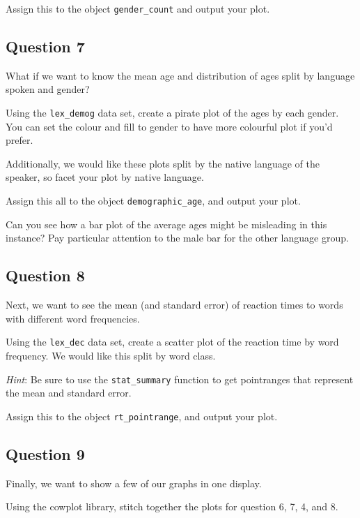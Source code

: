 \documentclass[
]{book}
\begin{document}
Assign this to the object \texttt{gender\_count} and output your plot.

\hypertarget{question-7-2}{%
\subsection{Question 7}\label{question-7-2}}

What if we want to know the mean age and distribution of ages split by language spoken and gender?

Using the \texttt{lex\_demog} data set, create a pirate plot of the ages by each gender. You can set the colour and fill to gender to have more colourful plot if you'd prefer.

Additionally, we would like these plots split by the native language of the speaker, so facet your plot by native language.

Assign this all to the object \texttt{demographic\_age}, and output your plot.

Can you see how a bar plot of the average ages might be misleading in this instance? Pay particular attention to the male bar for the other language group.

\hypertarget{question-8-2}{%
\subsection{Question 8}\label{question-8-2}}

Next, we want to see the mean (and standard error) of reaction times to words with different word frequencies.

Using the \texttt{lex\_dec} data set, create a scatter plot of the reaction time by word frequency. We would like this split by word class.

\emph{Hint}: Be sure to use the \texttt{stat\_summary} function to get pointranges that represent the mean and standard error.

Assign this to the object \texttt{rt\_pointrange}, and output your plot.

\hypertarget{question-9-2}{%
\subsection{Question 9}\label{question-9-2}}

Finally, we want to show a few of our graphs in one display.

Using the cowplot library, stitch together the plots for question 6, 7, 4, and 8.
\end{document}
